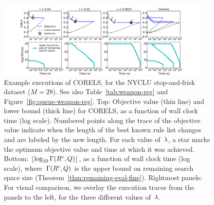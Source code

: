 \begin{figure}[t!]
\begin{center}
\includegraphics[trim={35mm 0mm 35mm 20mm},
width=0.95\textwidth]{figs/weapon_reg-execution.pdf}
\end{center}
\vspace{-5mm}
\caption{Example executions of CORELS, for the NYCLU stop-and-frisk dataset (${M = 28}$).
%
See also Table~\ref{tab:weapon-reg} and Figure~\ref{fig:queue-weapon-reg}.
%
Top: Objective value (thin line) and lower bound (thick line) for CORELS,
as a function of wall clock time (log scale).
%
Numbered points along the trace of the objective value
indicate when the length of the best known rule list changes
and are labeled by the new length.
%
For each value of~${\lambda}$, a star marks the optimum objective value
and time at which it was achieved.
%
Bottom: $\lfloor \log_{10} \Gamma({R^c}, Q) \rfloor$,
as a function of wall clock time (log scale),
where~$\Gamma({R^c}, Q)$
is the upper bound on remaining search space size
(Theorem~\ref{thm:remaining-eval-fine}).
%
Rightmost panels: For visual comparison, we overlay the execution traces
from the panels to the left, for the three different values of~${\lambda}$.
}
\label{fig:weapon-reg-execution}
\end{figure}

